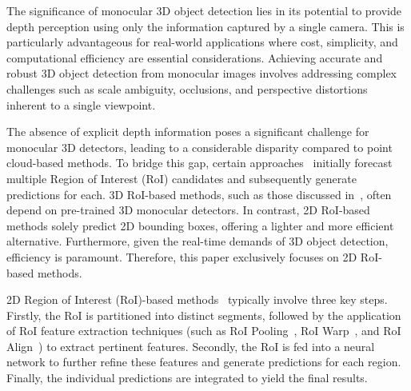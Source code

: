 \documentclass[journal]{IEEEtran}
\begin{document}
	The significance of monocular 3D object detection lies in its potential to provide depth perception using only the information captured by a single camera. This is particularly advantageous for real-world applications where cost, simplicity, and computational efficiency are essential considerations. Achieving accurate and robust 3D object detection from monocular images involves addressing complex challenges such as scale ambiguity, occlusions, and perspective distortions inherent to a single viewpoint.
	
	The absence of explicit depth information poses a significant challenge for monocular 3D detectors, leading to a considerable disparity compared to point cloud-based methods. To bridge this gap, certain approaches~\cite{gupnet, didm3d, neurocs} initially forecast multiple Region of Interest (RoI) candidates and subsequently generate predictions for each. 3D RoI-based methods, such as those discussed in~\cite{neurocs}, often depend on pre-trained 3D monocular detectors. In contrast, 2D RoI-based methods solely predict 2D bounding boxes, offering a lighter and more efficient alternative. Furthermore, given the real-time demands of 3D object detection, efficiency is paramount. Therefore, this paper exclusively focuses on 2D RoI-based methods.
	
	2D Region of Interest (RoI)-based methods~\cite{gupnet, didm3d} typically involve three key steps. Firstly, the RoI is partitioned into distinct segments, followed by the application of RoI feature extraction techniques (such as RoI Pooling~\cite{fast-rcnn}, RoI Warp~\cite{roi-warp}, and RoI Align~\cite{mask-rcnn}) to extract pertinent features. Secondly, the RoI is fed into a neural network to further refine these features and generate predictions for each region. Finally, the individual predictions are integrated to yield the final results.
\end{document}
